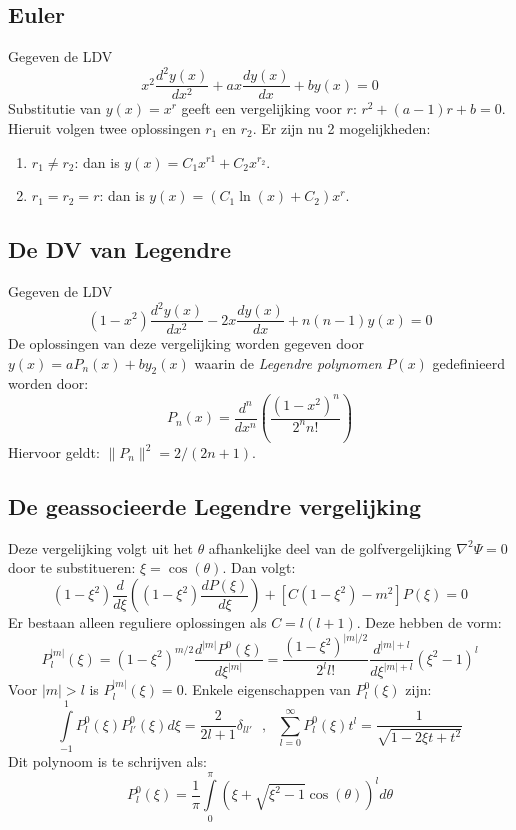 \documentclass[twoside]{report}
\begin{document}
\subsection{Euler}
Gegeven de LDV
\[
x^2\frac{d^2y(x)}{dx^2}+ax\frac{dy(x)}{dx}+by(x)=0
\]
Substitutie van $y(x)=x^r$ geeft een vergelijking voor $r$: $r^2+(a-1)r+b=0$.
Hieruit volgen twee oplossingen $r_1$ en $r_2$. Er zijn nu 2 mogelijkheden:
\begin{enumerate}
\item $r_1\neq r_2$: dan is $y(x)=C_1x^{r1}+C_2x^{r_2}$.
\item $r_1=r_2=r$: dan is $y(x)=(C_1\ln(x)+C_2)x^r$.
\end{enumerate}

\subsection{De DV van Legendre}
Gegeven de LDV 
\[
(1-x^2)\frac{d^2y(x)}{dx^2}-2x\frac{dy(x)}{dx}+n(n-1)y(x)=0
\]
De oplossingen van deze vergelijking worden gegeven door $y(x)=aP_n(x)+by_2(x)$
waarin de {\it Legendre polynomen} $P(x)$ gedefinieerd worden door:
\[
P_n(x)=\frac{d^n}{dx^n}\left(\frac{(1-x^2)^n}{2^n n!}\right)
\]
Hiervoor geldt: $\|P_n\|^2=2/(2n+1)$.

\subsection{De geassocieerde Legendre vergelijking}
Deze vergelijking volgt uit het $\theta$ afhankelijke deel van de
golfvergelijking $\nabla^2\Psi=0$ door te substitueren: $\xi=\cos(\theta)$.
Dan volgt:
\[
(1-\xi^2)\frac{d}{d\xi}\left((1-\xi^2)\frac{dP(\xi)}{d\xi}\right)+
[C(1-\xi^2)-m^2]P(\xi)=0
\]
Er bestaan alleen reguliere oplossingen als $C=l(l+1)$. Deze hebben de vorm:
\[
P_l^{|m|}(\xi)=(1-\xi^2)^{m/2}\frac{d^{|m|}P^0(\xi)}{d\xi^{|m|}}=
\frac{(1-\xi^2)^{|m|/2}}{2^ll!}\frac{d^{|m|+l}}{d\xi^{|m|+l}}(\xi^2-1)^l
\]
Voor $|m|>l$ is $P_l^{|m|}(\xi)=0$.
Enkele eigenschappen van $P_l^0(\xi)$ zijn:
\[
\int\limits_{-1}^1P_l^0(\xi)P_{l'}^0(\xi)d\xi=\frac{2}{2l+1}\delta_{ll'}~~~,~~~
\sum_{l=0}^\infty P_l^0(\xi)t^l=\frac{1}{\sqrt{1-2\xi t+t^2}}
\]
Dit polynoom is te schrijven als:
\[
P_l^0(\xi)=\frac{1}{\pi}\int\limits_0^\pi(\xi+\sqrt{\xi^2-1}\cos(\theta))^ld\theta
\]
\end{document}
